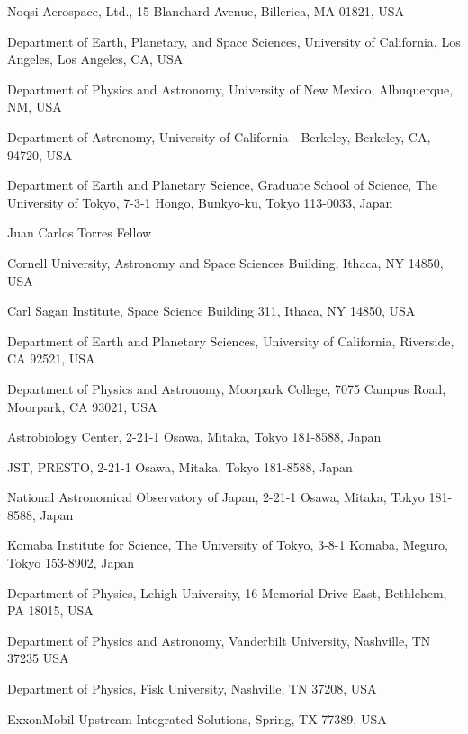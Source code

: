 \documentclass{nature3}
\begin{document}
\begin{affiliations}
\item Noqsi Aerospace, Ltd., 15 Blanchard Avenue, Billerica, MA 01821, USA
\item Department of Earth, Planetary, and Space Sciences, University of California, Los Angeles, Los Angeles, CA, USA
\item Department of Physics and Astronomy, University of New Mexico, Albuquerque, NM, USA
\item Department of Astronomy, University of California - Berkeley, Berkeley, CA, 94720, USA
\item Department of Earth and Planetary Science, Graduate School of Science, The University of Tokyo, 7-3-1 Hongo, Bunkyo-ku, Tokyo 113-0033, Japan
\item Juan Carlos Torres Fellow
\item Cornell University, Astronomy and Space Sciences Building, Ithaca, NY 14850, USA
\item Carl Sagan Institute, Space Science Building 311, Ithaca, NY 14850, USA
\item Department of Earth and Planetary Sciences, University of California, Riverside, CA 92521, USA
\item Department of Physics and Astronomy, Moorpark College, 7075 Campus Road, Moorpark, CA 93021, USA
\item Astrobiology Center, 2-21-1 Osawa, Mitaka, Tokyo 181-8588, Japan
\item JST, PRESTO, 2-21-1 Osawa, Mitaka, Tokyo 181-8588, Japan
\item National Astronomical Observatory of Japan, 2-21-1 Osawa, Mitaka, Tokyo 181-8588, Japan
\item Komaba Institute for Science, The University of Tokyo, 3-8-1 Komaba, Meguro, Tokyo 153-8902, Japan
\item Department of Physics, Lehigh University, 16 Memorial Drive East, Bethlehem, PA 18015, USA
\item Department of Physics and Astronomy, Vanderbilt University, Nashville, TN 37235 USA
\item Department of Physics, Fisk University, Nashville, TN 37208, USA
\item ExxonMobil Upstream Integrated Solutions, Spring, TX 77389, USA
\end{affiliations}
\normalsize
\end{document}
